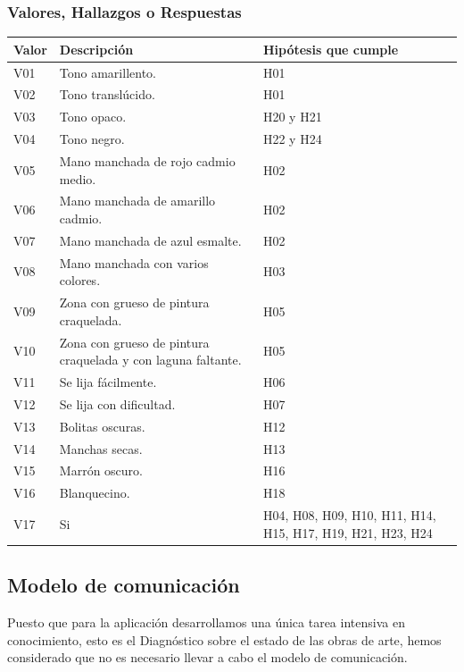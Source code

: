 \documentclass[a4paper,11pt]{article}
\begin{document}
			\subsubsection{Valores, Hallazgos o Respuestas}
			\begin{center}
				\begin{tabular}{| p{2cm} | p{6cm} | p{3cm} |}
					\hline
					\cellcolor[RGB]{224,233,250}\textbf{Valor} &
					\cellcolor[RGB]{224,233,250}\textbf{Descripción} &
					\cellcolor[RGB]{224,233,250}\textbf{Hipótesis que cumple}\\
					\hline
V01 & Tono amarillento. & H01\\
					\hline
V02 & Tono translúcido. & H01\\
					\hline
V03 & Tono opaco. & H20 y H21\\
					\hline
V04 & Tono negro. & H22 y H24\\
					\hline
V05 & Mano manchada de rojo cadmio medio. & H02\\
					\hline
V06 & Mano manchada de amarillo cadmio. & H02\\
					\hline
V07 & Mano manchada de azul esmalte. & H02\\
					\hline
V08 & Mano manchada con varios colores. & H03\\
					\hline
V09 & Zona con grueso de pintura craquelada. & H05\\
					\hline
V10 & Zona con grueso de pintura craquelada y con laguna faltante. & H05\\
					\hline
V11 & Se lija fácilmente. & H06\\
					\hline
V12 & Se lija con dificultad. & H07\\
					\hline
V13 & Bolitas oscuras. & H12\\
					\hline
V14 & Manchas secas. & H13\\
					\hline
V15 & Marrón oscuro. & H16\\
					\hline
V16 & Blanquecino. & H18\\
					\hline
V17 & Si & H04, H08, H09, H10, H11, H14, H15, H17, H19, H21, H23, H24\\
					\hline
				\end{tabular}
			\end{center}
		\newpage
		\subsection{Modelo de comunicación}
			Puesto que para la aplicación desarrollamos una única tarea intensiva en
			conocimiento, esto es el Diagnóstico sobre el estado de las obras de arte,
			hemos considerado que no es necesario llevar a cabo el modelo de
			comunicación.\\
			
\end{document}
